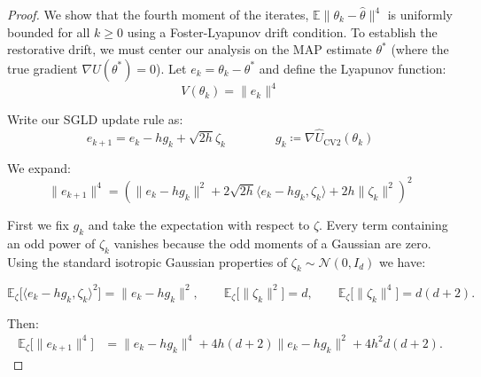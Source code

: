 \begin{proof}

We show that the fourth moment of the iterates, $\mathbb{E}\|\theta_k - \hat\theta\|^4$ is uniformly bounded for all $k \geq 0$ using a Foster-Lyapunov drift condition. To establish the restorative drift, we must center our analysis on the MAP estimate $\theta^*$ (where the true gradient $\nabla U(\theta^*) = 0$). Let $e_k = \theta_k - \theta^*$ and define the Lyapunov function:
$$V(\theta_k) = \|e_k\|^4$$

Write our SGLD update rule as:
$$e_{k+1} = e_k - hg_k + \sqrt{2h}\zeta_k \quad \quad \quad \quad g_k \coloneqq \nabla\hat{U}_{\text{CV2}}(\theta_k)$$

We expand:
$$\|e_{k+1}\|^4 = (\|e_k - hg_k\|^2 + 2\sqrt{2h}\langle e_k - hg_k, \zeta_k \rangle + 2h\|\zeta_k\|^2)^2$$

First we fix $g_k$ and take the expectation with respect to $\zeta$. Every term containing an odd power of $\zeta_k$ vanishes because the odd moments of a Gaussian are zero. Using the standard isotropic Gaussian properties of $\zeta_k \sim \mathcal{N}(0, I_d)$ we have:

\[
  \mathbb{E}_{\zeta}\bigl[\langle e_k - hg_k, \zeta_k \rangle^2\bigr] = \|e_k - hg_k\|^2,
  \qquad
  \mathbb{E}_{\zeta}\bigl[\|\zeta_k\|^2\bigr] = d,
  \qquad
  \mathbb{E}_{\zeta}\bigl[\|\zeta_k\|^4\bigr] = d(d+2).
\]

Then:
\begin{align}
\mathbb{E}_{\zeta}\bigl[\|e_{k+1}\|^4\bigr]
  &= \|e_k - hg_k\|^4
   + 4h(d+2)\|e_k - hg_k\|^2
   + 4h^2 d(d+2).
  \label{eq:after-zeta}
\end{align}


\end{proof}
